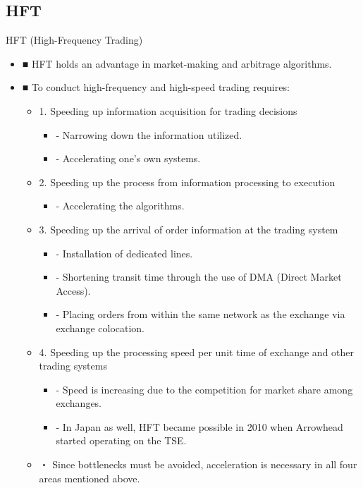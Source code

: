 \documentclass[dvipdfmx, autodetect-engine, aspectratio=169, 10.5pt]{beamer}
\begin{document}
\subsection{HFT}
\begin{frame}{HFT \textnormal{(High-Frequency Trading)}}
	\scriptsize
	\begin{itemize}
		\item ■ HFT holds an advantage in market-making and arbitrage algorithms.
		\item ■ To conduct high-frequency and high-speed trading requires:
		      \begin{itemize}
			      \item 1. Speeding up information acquisition for trading decisions
			            \begin{itemize}
				            \item - Narrowing down the information utilized.
				            \item - Accelerating one's own systems.
			            \end{itemize}
			      \item 2. Speeding up the process from information processing to execution
			            \begin{itemize}
				            \item - Accelerating the algorithms.
			            \end{itemize}
			      \item 3. Speeding up the arrival of order information at the trading system
			            \begin{itemize}
				            \item - Installation of dedicated lines.
				            \item - Shortening transit time through the use of DMA (Direct Market Access).
				            \item - Placing orders from within the same network as the exchange via exchange colocation.
			            \end{itemize}
			      \item 4. Speeding up the processing speed per unit time of exchange and other trading systems
			            \begin{itemize}
				            \item - Speed is increasing due to the competition for market share among exchanges.
				            \item - In Japan as well, HFT became possible in 2010 when Arrowhead started operating on the TSE.
			            \end{itemize}
			      \item ・ Since bottlenecks must be avoided, acceleration is necessary in all four areas mentioned above.
		      \end{itemize}
	\end{itemize}
\end{frame}
\end{document}
